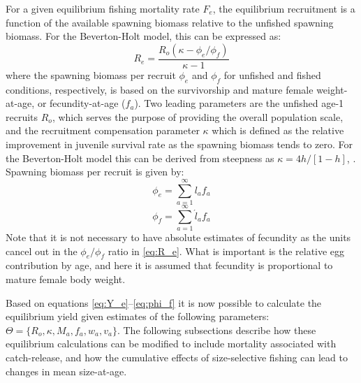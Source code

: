 \documentclass[12pt,leqno]{article}
\begin{document}
For a given equilibrium fishing mortality rate $F_e$, the equilibrium recruitment is a function of the available spawning biomass relative to the unfished spawning biomass. For the Beverton-Holt model, this can be expressed as:
\begin{equation}\label{eq:R_e}
	R_e = \frac{R_o (\kappa-\phi_e/\phi_f)}{\kappa -1} 
\end{equation}
where the spawning biomass per recruit $\phi_e$ and $\phi_f$ for unfished and fished conditions, respectively, is based on the survivorship and mature female weight-at-age,  or fecundity-at-age ($f_a$).  Two leading parameters are the unfished age-1 recruits $R_o$, which serves the purpose of providing the overall population scale, and the recruitment compensation parameter $\kappa$ which is defined as the relative improvement in juvenile survival rate as the spawning biomass tends to zero. For the Beverton-Holt model this can be derived from steepness as $\kappa= 4h/[1-h]$, \citep[see][for further details]{Martell2008pam}.  Spawning biomass per recruit is given by:
\begin{equation}
	\phi_e = \sum_{a=1}^\infty l_a f_a\label{eq:phi_e}
\end{equation}
\begin{equation}
	\phi_f = \sum_{a=1}^\infty \acute{l}_a f_a\label{eq:phi_f}
\end{equation}
Note that it is not necessary to have absolute estimates of fecundity as the units cancel out in the $\phi_e/\phi_f$ ratio in \eqref{eq:R_e}. What is important is the relative egg contribution by age, and here it is assumed that fecundity is proportional to mature female body weight.

Based on equations \ref{eq:Y_e}--\ref{eq:phi_f} it is now possible to calculate the equilibrium yield given estimates of the following parameters: $\Theta = \{R_o, \kappa, M_a, f_a, w_a, v_a\}$.  The following subsections describe how these equilibrium calculations can be modified to include mortality associated with catch-release, and how the cumulative effects of size-selective fishing can lead to changes in mean size-at-age.
\end{document}
